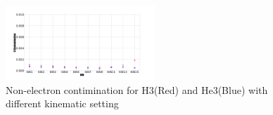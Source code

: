 \begin{figure}
 	
 		\includegraphics[width=0.5\textwidth]{./pid_plot/PID5.png}
 		\caption{ Non-electron contimination for H3(Red) and He3(Blue) with different kinematic setting  } \label{PPID5}
 	
\end{figure}   
 
%
%



